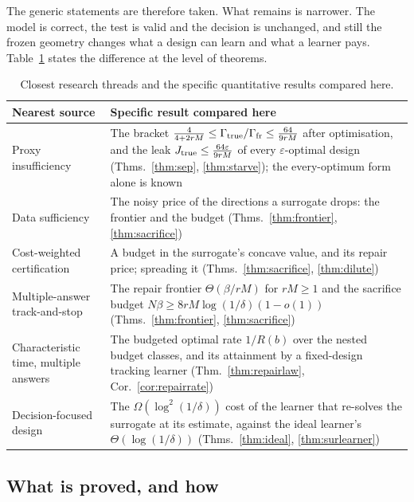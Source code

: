 The generic statements are therefore taken. What remains is narrower. The model is correct,
the test is valid and the decision is unchanged, and still the frozen geometry changes what a
design can learn and what a learner pays. Table~\ref{tab:prior} states the difference at the
level of theorems.

\begin{table}[h]
\caption{Closest research threads and the specific quantitative results compared here.}
\label{tab:prior}
\centering
\footnotesize
\begin{tabular}{@{}p{}p{}@{}}
\toprule
Nearest source & Specific result compared here \\
\midrule
Proxy insufficiency~\cite{schutte2026,overstall2022} & The bracket
$\frac{4}{4+2rM}\le\Gamma_{\rm true}/\Gamma_{\rm fr}\le\frac{64}{9rM}$ after optimisation, and
the leak $J_{\rm true}\le\frac{64\varepsilon}{9rM}$ of every $\varepsilon$-optimal design
(Thms.~\ref{thm:sep}, \ref{thm:starve}); the every-optimum form alone is known \\
Data sufficiency~\cite{bennouna2025} & The noisy price of the directions a surrogate drops: the
frontier and the budget (Thms.~\ref{thm:frontier}, \ref{thm:sacrifice}) \\
Cost-weighted certification~\cite{huang2026,yang2024} & A budget in the surrogate's concave
value, and its repair price; spreading it (Thms.~\ref{thm:sacrifice}, \ref{thm:dilute}) \\
Multiple-answer track-and-stop~\cite{degenne2019} & The repair frontier
$\Theta(\beta/rM)$ for $rM\ge1$ and the sacrifice budget $N\beta\ge8rM\log(1/\delta)(1-o(1))$
(Thms.~\ref{thm:frontier}, \ref{thm:sacrifice}) \\
Characteristic time, multiple answers~\cite{garivier2016,degenne2019} & The budgeted optimal rate
$1/R(b)$ over the nested budget classes, and its attainment by a fixed-design tracking learner
(Thm.~\ref{thm:repairlaw}, Cor.~\ref{cor:repairrate}) \\
Decision-focused design~\cite{wan2026} & The $\Omega(\log^{2}(1/\delta))$ cost of the
learner that re-solves the surrogate at its estimate, against the ideal learner's
$\Theta(\log(1/\delta))$ (Thms.~\ref{thm:ideal}, \ref{thm:surlearner}) \\
\bottomrule
\end{tabular}
\end{table}

\subsection{What is proved, and how}

